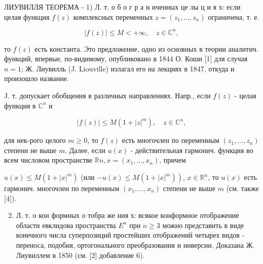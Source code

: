 \documentclass[10pt]{article}
\begin{document}
ЛИУВИЛЛЯ ТЕОРЕМА - 1) Л. т. о б о г р а н иченных це лы ц и я х: если целая функция $f(z)$ комплексных переменных $z=\left(z_{1}, \ldots, z_{n}\right)$ ограничена, т. е.



\[

|f(z)| \leqslant M<+\infty, \quad z \in \mathbb{C}^{n},

\]



то $f(z)$ есть константа. Это предложение, одно из основных в теории аналитич. функций, впервые, по-видимому, опубликовано в 1844 О. Коши [1] для случая $n=1$; Ж. Лиувилль (J. Liouville) излагал его на лекциях в 1847, откуда и произошло название.



J. т. допускает обобщения в различных направлениях. Напр., если $f(z)$ - целая функция в $\mathbb{C}^{n}$ и



\[

|f(z)| \leqslant M\left(1+|z|^{m}\right), \quad z \in \mathbb{C}^{n},

\]



для нек-рого целого $m \geqslant 0$, то $f(z)$ есть многочлен по переменным $\left(z_{1}, \ldots, z_{n}\right)$ степени не выше $m$. Далее, если $u(x)$ - действительная гармонич. функция во всем числовом пространстве $\mathbb{R} n, x=\left(x_{1}, \ldots, x_{n}\right)$, причем



$u(x) \leqslant M\left(1+|x|^{m}\right)$ (или $\left.-u(x) \leqslant M\left(1+|x|^{m}\right)\right)$, $x \in \mathbb{R}^{n}$, то $u(x)$ есть гармонич. многочлен по переменным $\left(x_{1}, \ldots, x_{n}\right)$ степени не выше $m$ (см. также [4]).



\begin{enumerate}

  \setcounter{enumi}{1}

  \item Л. т. о кон формных о тобра же ния х: всякое конформное отображение области евклидова пространства $E^{n}$ при $n \geqslant 3$ можно представить в виде конечного числа суперпозиций простейших отображений четырех видов - переноса, подобия, ортогонального преобразования и инверсии. Доказана Ж. Лиувиллем в 1850 (см. [2] добавление 6).

\end{enumerate}
\end{document}
